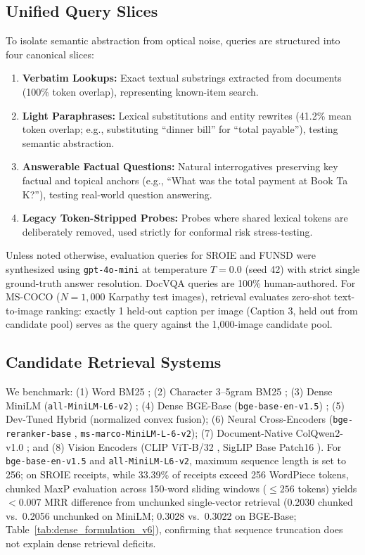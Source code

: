 \subsection{Unified Query Slices}
To isolate semantic abstraction from optical noise, queries are structured into four canonical slices:
\begin{enumerate}
    \setlength{\itemsep}{0.2pt plus 0.1pt}
    \setlength{\parskip}{0pt}
    \item \textbf{Verbatim Lookups:} Exact textual substrings extracted from documents (100\% token overlap), representing known-item search.
    \item \textbf{Light Paraphrases:} Lexical substitutions and entity rewrites (41.2\% mean token overlap; e.g., substituting ``dinner bill'' for ``total payable''), testing semantic abstraction.
    \item \textbf{Answerable Factual Questions:} Natural interrogatives preserving key factual and topical anchors (e.g., ``What was the total payment at Book Ta K?''), testing real-world question answering.
    \item \textbf{Legacy Token-Stripped Probes:} Probes where shared lexical tokens are deliberately removed, used strictly for conformal risk stress-testing.
\end{enumerate}
Unless noted otherwise, evaluation queries for SROIE and FUNSD were synthesized using \texttt{gpt-4o-mini} \cite{openai2024gpt4o} at temperature $T=0.0$ (seed 42) with strict single ground-truth answer resolution. DocVQA queries are 100\% human-authored. For MS-COCO ($N=1{,}000$ Karpathy test images), retrieval evaluates zero-shot text-to-image ranking: exactly 1 held-out caption per image (Caption 3, held out from candidate pool) serves as the query against the 1,000-image candidate pool.

\subsection{Candidate Retrieval Systems}
We benchmark: (1) Word BM25 \cite{robertson2009bm25}; (2) Character 3--5gram BM25 \cite{mcnamee2004character}; (3) Dense MiniLM (\texttt{all-MiniLM-L6-v2}) \cite{reimers2019sbert}; (4) Dense BGE-Base (\texttt{bge-base-en-v1.5}) \cite{xiao2023bge}; (5) Dev-Tuned Hybrid (normalized convex fusion); (6) Neural Cross-Encoders (\texttt{bge-reranker-base} \cite{xiao2023bge}, \texttt{ms-marco-MiniLM-L-6-v2}); (7) Document-Native ColQwen2-v1.0 \cite{faysse2024colqwen2}; and (8) Vision Encoders (CLIP ViT-B/32 \cite{radford2021clip}, SigLIP Base Patch16 \cite{zhai2023siglip}). For \texttt{bge-base-en-v1.5} and \texttt{all-MiniLM-L6-v2}, maximum sequence length is set to 256; on SROIE receipts, while 33.39\% of receipts exceed 256 WordPiece tokens, chunked MaxP evaluation across 150-word sliding windows ($\le 256$ tokens) yields $<0.007$ MRR difference from unchunked single-vector retrieval (0.2030 chunked vs.\ 0.2056 unchunked on MiniLM; 0.3028 vs.\ 0.3022 on BGE-Base; Table~\ref{tab:dense_formulation_v6}), confirming that sequence truncation does not explain dense retrieval deficits.

